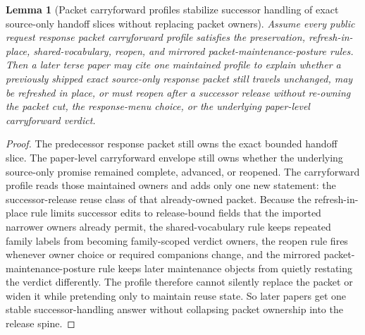 \documentclass[11pt]{article}
\newtheorem{lemma}{Lemma}
\begin{document}
\begin{lemma}[Packet carryforward profiles stabilize successor handling of exact source-only handoff slices without replacing packet owners]
Assume every public request response packet carryforward profile satisfies the preservation, refresh-in-place, shared-vocabulary, reopen, and mirrored packet-maintenance-posture rules.
Then a later terse paper may cite one maintained profile to explain whether a previously shipped exact source-only response packet still travels unchanged, may be refreshed in place, or must reopen after a successor release without re-owning the packet cut, the response-menu choice, or the underlying paper-level carryforward verdict.
\end{lemma}

\begin{proof}
The predecessor response packet still owns the exact bounded handoff slice.
The paper-level carryforward envelope still owns whether the underlying source-only promise remained complete, advanced, or reopened.
The carryforward profile reads those maintained owners and adds only one new statement: the successor-release reuse class of that already-owned packet.
Because the refresh-in-place rule limits successor edits to release-bound fields that the imported narrower owners already permit, the shared-vocabulary rule keeps repeated family labels from becoming family-scoped verdict owners, the reopen rule fires whenever owner choice or required companions change, and the mirrored packet-maintenance-posture rule keeps later maintenance objects from quietly restating the verdict differently. The profile therefore cannot silently replace the packet or widen it while pretending only to maintain reuse state.
So later papers get one stable successor-handling answer without collapsing packet ownership into the release spine.\qedhere
\end{proof}
\end{document}
